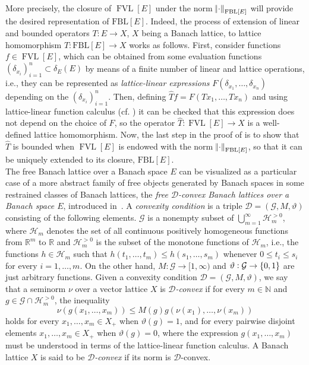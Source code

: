 \documentclass[12pt,leqno]{amsart}
\numberwithin{equation}{section} %
\theoremstyle{definition}
\numberwithin{equation}{section}
\newcommand{\N}{\mathbb{N}}
\newcommand{\R}{\mathbb{R}}
\newcommand{\Hcal}{\mathcal{H}}
\newcommand{\Gcal}{\mathcal{G}}
\newcommand{\Dcal}{\mathcal{D}}
\newcommand{\fbl}{\mathrm{FBL}}
\DeclareMathOperator{\FVL}{FVL}
\newcommand{\nFBLE}[1]{\norm{#1}_{\mathrm{FBL}[E]}}
\begin{document}
More precisely, the closure of $\FVL[E]$ under the norm $\nFBLE{\cdot}$ will provide the desired representation of $\fbl[E]$. Indeed, the process of extension of linear and bounded operators $T:E\rightarrow X$, $X$ being a Banach lattice, to lattice homomorphism $\hat{T}:\fbl[E]\rightarrow X$ works as follows. First, consider functions $f\in \FVL[E]$, which can be obtained from some evaluation functions $(\delta_{x_i})_{i=1}^n \subset \delta_E(E)$ by means of a finite number of linear and lattice operations, i.e., they can be represented as \textit{lattice-linear expressions} $F(\delta_{x_1},\ldots,\delta_{x_n})$ depending on the $(\delta_{x_i})_{i=1}^n$. Then, defining $\hat{T}f=F(Tx_1,\ldots,Tx_n)$ and using lattice-linear function calculus (cf. \cite[Section 1.d]{LT2}) it can be checked that this expression does not depend on the choice of $F$, so the operator $\hat{T}:\FVL[E]\rightarrow X$ is a well-defined lattice homomorphism. Now, the last step in the proof of \cite[Theorem 2.5]{ART} is to show that $\hat{T}$ is bounded when $\FVL[E]$ is endowed with the norm $\nFBLE{\cdot}$, so that it can be uniquely extended to its closure, $\fbl[E]$.\\

The free Banach lattice over a Banach space $E$ can be visualized as a particular case of a more abstract family of free objects generated by Banach spaces in some restrained classes of Banach lattices, the \textit{free $\Dcal$-convex Banach lattices over a Banach space $E$}, introduced in~\cite{JLTTT}. A \textit{convexity condition} is a triple $\Dcal=(\Gcal, M, \vartheta)$ consisting of the following elements. $\Gcal$ is a nonempty subset of $\bigcup_{m=1}^{\infty} \Hcal_m^{>0}$, where $\Hcal_m$ denotes the set of all continuous positively homogeneous functions from $\R^m$ to $\R$ and $\Hcal_m^{>0}$ is the subset of the monotone functions of $\Hcal_m$, i.e., the functions $h\in \Hcal_m$ such that $h(t_1,\ldots,t_m)\leq h(s_1,\ldots,s_m)$ whenever $0\leq t_i\leq s_i$ for every $i=1,\ldots,m$. On the other hand, $M:\Gcal\rightarrow [1,\infty)$ and $\vartheta:\Gcal \rightarrow \cbr{0,1}$ are just arbitrary functions. Given a convexity condition $\Dcal=(\Gcal, M, \vartheta)$, we say that a seminorm $\nu$ over a vector lattice $X$ is \textit{$\Dcal$-convex} if for every $m\in \N$ and $g\in \Gcal\cap \Hcal_m^{>0}$, the inequality
\begin{equation*}
    \nu(g(x_1,\ldots,x_m))\leq M(g) g(\nu(x_1),\ldots,\nu(x_m))
\end{equation*}
holds for every $x_1,\ldots,x_m\in X_+$ when $\vartheta(g)=1$, and for every pairwise disjoint elements $x_1,\ldots,x_m\in X_+$ when $\vartheta(g)=0$, where the expression $g(x_1,\ldots,x_m)$ must be understood in terms of the lattice-linear function calculus. A Banach lattice $X$ is said to be \textit{$\Dcal$-convex} if its norm is $\Dcal$-convex.\\
\end{document}
